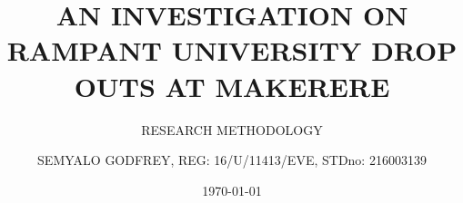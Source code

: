 \documentclass[a4paper,12pt]{report}
\begin{document}
\author{RESEARCH METHODOLOGY}
\author{SEMYALO GODFREY, REG: 16/U/11413/EVE, STDno: 216003139}
\date{\today}
\title {AN INVESTIGATION ON  RAMPANT UNIVERSITY DROP OUTS  AT MAKERERE}
\maketitle
\end{document}
